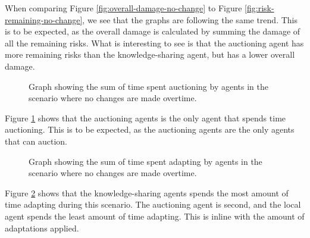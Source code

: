 When comparing Figure \ref{fig:overall-damage-no-change} to Figure \ref{fig:risk-remaining-no-change}, we see that the graphs are following the same trend. This is to be expected, as the overall damage is calculated by summing the damage of all the remaining risks. What is interesting to see is that the auctioning agent has more remaining risks than the knowledge-sharing agent, but has a lower overall damage. 

\begin{figure}[H]
    \hspace*{-1.2cm}
    \centering
        
    \caption{Graph showing the sum of time spent auctioning by agents in the scenario where no changes are made overtime.}
    \label{fig:auctioning-time-no-change}
\end{figure}

Figure \ref{fig:auctioning-time-no-change} shows that the auctioning agents is the only agent that spends time auctioning. This is to be expected, as the auctioning agents are the only agents that can auction.

\begin{figure}[H]
    \hspace*{-1.2cm}
    \centering
        
    \caption{Graph showing the sum of time spent adapting by agents in the scenario where no changes are made overtime.}
    \label{fig:adapting-time-no-change}
\end{figure}

Figure \ref{fig:adapting-time-no-change} shows that the knowledge-sharing agents spends the most amount of time adapting during this scenario. The auctioning agent is second, and the local agent spends the least amount of time adapting. This is inline with the amount of adaptations applied.
